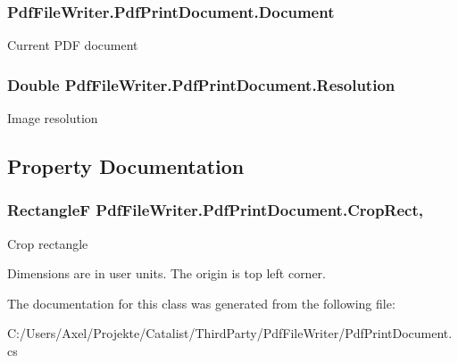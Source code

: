 \subsubsection[{\texorpdfstring{Document}{Document}}]{ Pdf\+File\+Writer.\+Pdf\+Print\+Document.\+Document\hspace{0.3cm}{\ttfamily [protected]}}\hypertarget{class_pdf_file_writer_1_1_pdf_print_document_aedc2e1a562b0933d302df93071aa4bc8}{}\label{class_pdf_file_writer_1_1_pdf_print_document_aedc2e1a562b0933d302df93071aa4bc8}


Current P\+DF document 

\subsubsection[{\texorpdfstring{Resolution}{Resolution}}]{\setlength{\rightskip}{0pt plus 5cm}Double Pdf\+File\+Writer.\+Pdf\+Print\+Document.\+Resolution\hspace{0.3cm}{\ttfamily [protected]}}\hypertarget{class_pdf_file_writer_1_1_pdf_print_document_a6597d5ffcf16bdcac7f7551b0c1be9b3}{}\label{class_pdf_file_writer_1_1_pdf_print_document_a6597d5ffcf16bdcac7f7551b0c1be9b3}


Image resolution 



\subsection{Property Documentation}
\subsubsection[{\texorpdfstring{Crop\+Rect}{CropRect}}]{\setlength{\rightskip}{0pt plus 5cm}RectangleF Pdf\+File\+Writer.\+Pdf\+Print\+Document.\+Crop\+Rect\hspace{0.3cm}{\ttfamily [get]}, {\ttfamily [set]}}\hypertarget{class_pdf_file_writer_1_1_pdf_print_document_ac82c4ca7b2fb84417c42096c78e67cbe}{}\label{class_pdf_file_writer_1_1_pdf_print_document_ac82c4ca7b2fb84417c42096c78e67cbe}


Crop rectangle 

Dimensions are in user units. The origin is top left corner. 

The documentation for this class was generated from the following file\+:\begin{DoxyCompactItemize}
\item 
C\+:/\+Users/\+Axel/\+Projekte/\+Catalist/\+Third\+Party/\+Pdf\+File\+Writer/Pdf\+Print\+Document.\+cs\end{DoxyCompactItemize}
